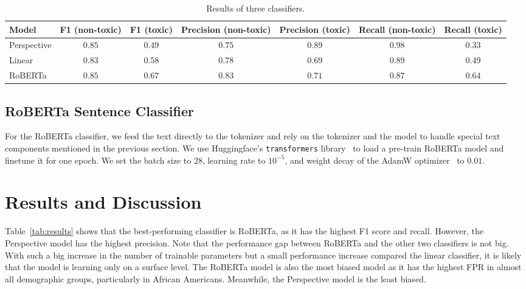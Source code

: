 \documentclass[11pt]{article}
\begin{document}
    \begin{table*}[h]
        \small
        \centering
        \begin{tabular}{lcccccc}
            \hline
            Model       & F1 (non-toxic) & F1 (toxic) & Precision (non-toxic) & Precision (toxic) & Recall (non-toxic) & Recall (toxic)  \\
            \hline
            Perspective & $0.85$         & $0.49$     & $0.75$                & $0.89$            & $0.98$             & $0.33$         \\\hline
            Linear      & $0.83$         & $0.58$     & $0.78$                & $0.69$            & $0.89$             & $0.49$         \\\hline
            RoBERTa     & $0.85$         & $0.67$     & $0.83$                & $0.71$            & $0.87$             & $0.64$         \\\hline
        \end{tabular}

        \caption{Results of three classifiers.}
        \label{tab:results_detail}
    \end{table*}

    \subsection{RoBERTa Sentence Classifier}

    For the RoBERTa classifier, we feed the text directly to the tokenizer and rely on the tokenizer and the model
    to handle special text components mentioned in the previous section.
    We use Huggingface's \texttt{transformers} library~\cite{huggingface} to load a pre-train RoBERTa model and
    finetune it for one epoch.
    We set the batch size to $28$, learning rate to $10^{-5}$, and weight decay of the AdamW optimizer~\cite{adamw}
    to $0.01$.


    \section{Results and Discussion}

    Table~\ref{tab:results} shows that the best-performing classifier is RoBERTa, as it has the highest
    F1 score and recall.
    However, the Perspective model has the highest precision.
    Note that the performance gap between RoBERTa and the other two classifiers is not big.
    With such a big increase in the number of trainable parameters but a small performance increase
    compared the linear classifier, it is likely that the model is learning only on a surface level.
    The RoBERTa model is also the most biased model as it has the highest FPR in almost all demographic groups,
    particularly in African Americans.
    Meanwhile, the Perspective model is the least biased.
\end{document}
